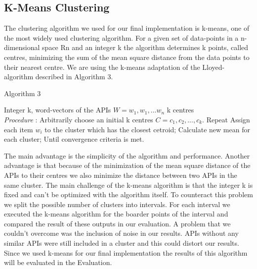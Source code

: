 \documentclass[a4paper]{IEEEtran}
\begin{document}
\subsection{K-Means Clustering}
The clustering algorithm we used for our final implementation is k-means, one of the most widely used clustering algorithm. For a given set of data-points in a n-dimensional space Rn and an integer k the algorithm determines k points, called centres, minimizing the sum of the mean square distance from the data points to their nearest centre. We are using the k-means adaptation of the Lloyed-algorithm described in Algorithm 3\cite{kanungo2002efficient}.

\begin{algorithm}[H]
 \caption{Algorithm 3}
 \begin{algorithmic}[1]
\renewcommand{\algorithmicrequire}{\textbf{Input:}}
 \renewcommand{\algorithmicensure}{\textbf{Output:}}
 \REQUIRE Integer k, \newline word-vectors of the APIs $W={w_1, w_1, ... w_n}$
 \ENSURE  k centres
 \\ \textit{Procedure} :
  \STATE Arbitrarily choose an initial k centres $C = {c_1, c_2, ..., c_k}$.
 \STATE Repeat \newline
\noindent\hspace*{5mm}%
			Assign each item $w_i$ to the cluster which has \newline 
\noindent\hspace*{5mm}%
			the closest cetroid;\newline
\noindent\hspace*{5mm}%
			Calculate new mean for each cluster;\newline
\newline
	Until convergence criteria is met.
 \end{algorithmic}
 \end{algorithm}



The main advantage is the simplicity of the algorithm and performance. Another advantage is that because of the minimization of the mean square distance of the APIs to their centres we also minimize the distance between two APIs in the same cluster.
The main challenge of the k-means algorithm is that the integer k is fixed and can’t be optimized with the algorithm itself. To counteract this problem we split the possible number of clusters into intervals. For each interval we executed the k-means algorithm for the boarder points of the interval and compared the result of these outputs in our evaluation.
A problem that we couldn’t overcome was the inclusion of noise in our results. APIs without any similar APIs were still included in a cluster and this could distort our results.
Since we used k-means for our final implementation the results of this algorithm will be evaluated in the Evaluation.
\end{document}
